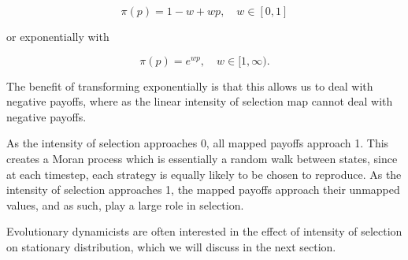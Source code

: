 \begin{equation*}
    \pi(p) = 1 - w + wp, \quad w \in [0,1]
\end{equation*}

or exponentially with

\begin{equation*}
    \pi(p) = e^{wp}, \quad w \in [1, \infty).
\end{equation*}

The benefit of transforming exponentially is that this allows us to deal with negative payoffs, where as the linear intensity of selection map cannot deal with negative payoffs.

As the intensity of selection approaches 0, all mapped payoffs approach 1.
This creates a Moran process which is essentially a random walk between states, since at each timestep, each strategy is equally likely to be chosen to reproduce.
As the intensity of selection approaches 1, the mapped payoffs approach their unmapped values, and as such, play a large role in selection.

Evolutionary dynamicists are often interested in the effect of intensity of selection on stationary distribution, which we will discuss in the next section.
